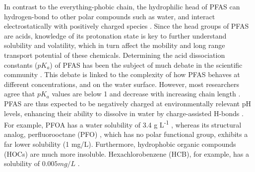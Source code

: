 In contrast to the everything-phobic chain, the hydrophilic head of PFAS can hydrogen-bond to other polar compounds such as water, and interact electrostatically with positively charged species \citep{sigmund2022sorption}. Since the head groups of PFAS are acids, knowledge of its protonation state is key to further understand solubility and volatility, which in turn affect the mobility and long range transport potential of these chemicals. Determining the acid dissociation constants (\(pK_a\)) of PFAS has been the subject of much debate in the scientific community \citep{Goss2009comment}. This debate is linked to the complexity of how PFAS behaves at different concentrations, and on the water surface. However, most researchers agree that \(pK_a\) values are below 1 and decrease with increasing chain length \citep{wang2011physchem,Reemtsma2016}. PFAS are thus expected to be negatively charged at environmentally relevant pH levels, enhancing their ability to dissolve in water by charge-assisted H-bonds \citep{Reemtsma2016}. For example, PFOA has a water solubility of 3.4 g L\textsuperscript{-1} \citep{PFOA}, whereas its structural analog, perfluorooctane (PFO) \citep{PFO}, which has no polar functional group, exhibits a far lower solubility (1 mg/L). Furthermore, hydrophobic organic compounds (\acrshort{HOC}s) are much more insoluble. Hexachlorobenzene (HCB), for example, has a solubility of $0.005 mg/L$ \citep{mcphedran2013hydrophobic}. 

